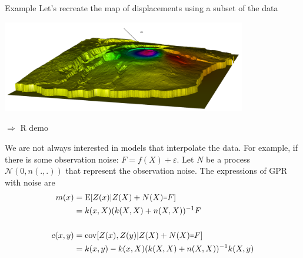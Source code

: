 \begin{frame}{}
\begin{exampleblock}{Example}
Let's recreate the map of displacements using a subset of the data    
\begin{center}
\includegraphics[height=4cm]{1_stat_models/figures/piton_ulos_2}
\end{center}
\end{exampleblock}
\alert{$\Rightarrow$ R demo}
\end{frame}

\begin{frame}{}
We are not always interested in models that interpolate the data. For example, if there is some observation noise: $F = f(X) + \varepsilon$.
\vspace{5mm}
Let $N$ be a process $\mathcal{N}(0,n(.,.))$ that represent the observation noise. The expressions of GPR with noise are
\begin{equation*}
	\begin{split}
	m(x) &= \E[Z(x)|Z(X) + N(X) \shorteq F] \\
	&= k(x,X) (k(X,X)+n(X,X))^{-1} F \\
	& \\
	c(x,y) &= \Cov[Z(x),Z(y)|Z(X)+ N(X) \shorteq F] \\
	&= k(x,y) - k(x,X) (k(X,X)+n(X,X))^{-1} k(X,y)
\end{split}
\end{equation*}
\end{frame}

